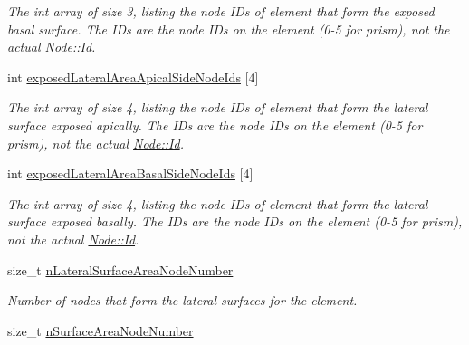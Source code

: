 \begin{DoxyCompactItemize}
\begin{DoxyCompactList}\small\item\em The int array of size 3, listing the node I\+Ds of element that form the exposed basal surface. The I\+Ds are the node I\+Ds on the element (0-\/5 for prism), not the actual \hyperlink{classNode_a1bd379569cc1a8b96432e61971aed4d9}{Node\+::\+Id}. \end{DoxyCompactList}\item 
\hypertarget{classShapeBase_a2724f82bbf8c657c075826f953f0b7f2}{}int \hyperlink{classShapeBase_a2724f82bbf8c657c075826f953f0b7f2}{exposed\+Lateral\+Area\+Apical\+Side\+Node\+Ids} \mbox{[}4\mbox{]}\label{classShapeBase_a2724f82bbf8c657c075826f953f0b7f2}

\begin{DoxyCompactList}\small\item\em The int array of size 4, listing the node I\+Ds of element that form the lateral surface exposed apically. The I\+Ds are the node I\+Ds on the element (0-\/5 for prism), not the actual \hyperlink{classNode_a1bd379569cc1a8b96432e61971aed4d9}{Node\+::\+Id}. \end{DoxyCompactList}\item 
\hypertarget{classShapeBase_a28b58f2840dd8ffd571c647534ad9f0b}{}int \hyperlink{classShapeBase_a28b58f2840dd8ffd571c647534ad9f0b}{exposed\+Lateral\+Area\+Basal\+Side\+Node\+Ids} \mbox{[}4\mbox{]}\label{classShapeBase_a28b58f2840dd8ffd571c647534ad9f0b}

\begin{DoxyCompactList}\small\item\em The int array of size 4, listing the node I\+Ds of element that form the lateral surface exposed basally. The I\+Ds are the node I\+Ds on the element (0-\/5 for prism), not the actual \hyperlink{classNode_a1bd379569cc1a8b96432e61971aed4d9}{Node\+::\+Id}. \end{DoxyCompactList}\item 
\hypertarget{classShapeBase_a433035a8df676eec3fbac2e510d483b4}{}size\+\_\+t \hyperlink{classShapeBase_a433035a8df676eec3fbac2e510d483b4}{n\+Lateral\+Surface\+Area\+Node\+Number}\label{classShapeBase_a433035a8df676eec3fbac2e510d483b4}

\begin{DoxyCompactList}\small\item\em Number of nodes that form the lateral surfaces for the element. \end{DoxyCompactList}\item 
\hypertarget{classShapeBase_ad3795d719f61808a05327aa4e3cf0355}{}size\+\_\+t \hyperlink{classShapeBase_ad3795d719f61808a05327aa4e3cf0355}{n\+Surface\+Area\+Node\+Number}\label{classShapeBase_ad3795d719f61808a05327aa4e3cf0355}


\end{DoxyCompactItemize}
